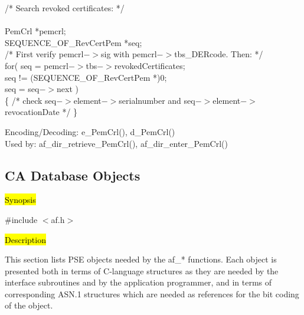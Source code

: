 {\small
\btab
\1 /* Search revoked certificates: */ \\ \\
\1      PemCrl   \4 *pemcrl;    \\
\1      SEQUENCE\_OF\_RevCertPem \4 *seq;  \\
\1      /* First verify pemcrl$->$sig with pemcrl$->$tbs\_DERcode. Then: */ \\
\1      for( seq = pemcrl$->$tbs$->$revokedCertificates; \\
\2        seq != (SEQUENCE\_OF\_RevCertPem *)0; \\
\2        seq = seq$->$next ) \\
\1      \{ /* check seq$->$element$->$serialnumber and seq$->$element$->$revocationDate */ \} \\
\etab
}

Encoding/Decoding: e\_PemCrl(), d\_PemCrl() \\
Used by: af\_dir\_retrieve\_PemCrl(), af\_dir\_enter\_PemCrl()


\subsection{CA Database Objects}
\label{af-sw-cc}

\hl{Synopsis}

\#include $<$af.h$>$

\hl{Description}
     
This section lists PSE objects needed by the af\_* functions. 
Each object is presented both in terms
of C-language structures as they are needed by the interface subroutines and
by the application programmer, and in terms of corresponding ASN.1 structures
which are needed as references for the bit coding of the object.
 
